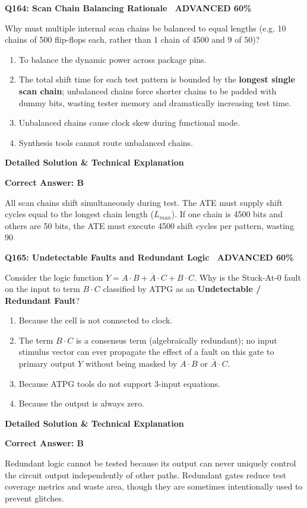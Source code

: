 \documentclass[11pt,a4paper]{article}
\newcommand{\badgeadv}{{\color{white}\colorbox{advred}{\bfseries\sffamily\tiny\ ADVANCED 60\%\ }}}
\newenvironment{qbox}[2]{%
  \begin{mdframed}[style=qstyle]%
  {\bfseries\sffamily\color{primaryblue}#1 \hfill #2}\par\vspace{2pt}%
}{%
  \end{mdframed}%
}
\newenvironment{ansbox}{%
  \begin{mdframed}[style=ansstyle]%
  {\bfseries\sffamily\color{ansgreen}\small Detailed Solution \& Technical Explanation}\par\vspace{2pt}\small%
}{%
  \end{mdframed}%
}
\begin{document}
\begin{qbox}{Q164: Scan Chain Balancing Rationale}{\badgeadv}
Why must multiple internal scan chains be balanced to equal lengths (e.g. 10 chains of 500 flip-flops each, rather than 1 chain of 4500 and 9 of 50)?
\begin{enumerate}[label=\textbf{\Alph*.}]
  \item To balance the dynamic power across package pins.
  \item The total shift time for each test pattern is bounded by the \textbf{longest single scan chain}; unbalanced chains force shorter chains to be padded with dummy bits, wasting tester memory and dramatically increasing test time.
  \item Unbalanced chains cause clock skew during functional mode.
  \item Synthesis tools cannot route unbalanced chains.
\end{enumerate}
\end{qbox}
\begin{ansbox}
\textbf{Correct Answer: B}

All scan chains shift simultaneously during test. The ATE must supply shift cycles equal to the longest chain length ($L_{max}$). If one chain is 4500 bits and others are 50 bits, the ATE must execute 4500 shift cycles per pattern, wasting 90%
\end{ansbox}

\begin{qbox}{Q165: Undetectable Faults and Redundant Logic}{\badgeadv}
Consider the logic function $Y = A \cdot B + \overline{A} \cdot C + B \cdot C$.  
Why is the Stuck-At-0 fault on the input to term $B \cdot C$ classified by ATPG as an \textbf{Undetectable / Redundant Fault}?
\begin{enumerate}[label=\textbf{\Alph*.}]
  \item Because the cell is not connected to clock.
  \item The term $B \cdot C$ is a consensus term (algebraically redundant); no input stimulus vector can ever propagate the effect of a fault on this gate to primary output $Y$ without being masked by $A \cdot B$ or $\overline{A} \cdot C$.
  \item Because ATPG tools do not support 3-input equations.
  \item Because the output is always zero.
\end{enumerate}
\end{qbox}
\begin{ansbox}
\textbf{Correct Answer: B}

Redundant logic cannot be tested because its output can never uniquely control the circuit output independently of other paths. Redundant gates reduce test coverage metrics and waste area, though they are sometimes intentionally used to prevent glitches.
\end{ansbox}
\end{document}
